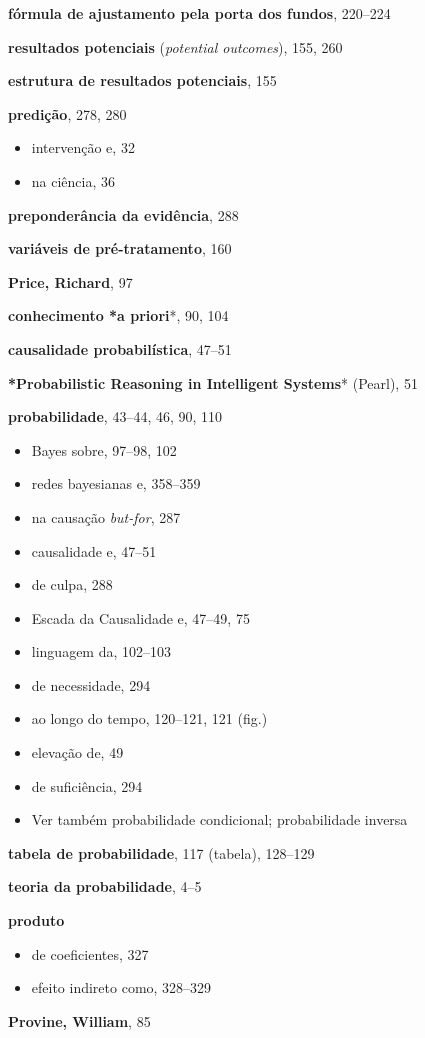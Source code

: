 \documentclass[11pt,a5paper,twoside]{book}
\begin{document}
\textbf{fórmula de ajustamento pela porta dos fundos}, 220–224

\textbf{resultados potenciais} (\textit{potential outcomes}), 155, 260

\textbf{estrutura de resultados potenciais}, 155

\textbf{predição}, 278, 280

\begin{itemize}
\item intervenção e, 32
\item na ciência, 36
\end{itemize}
\textbf{preponderância da evidência}, 288

\textbf{variáveis de pré-tratamento}, 160

\textbf{Price, Richard}, 97

\textbf{conhecimento *a priori}*, 90, 104

\textbf{causalidade probabilística}, 47–51

\textbf{*Probabilistic Reasoning in Intelligent Systems}* (Pearl), 51

\textbf{probabilidade}, 43–44, 46, 90, 110

\begin{itemize}
\item Bayes sobre, 97–98, 102
\item redes bayesianas e, 358–359
\item na causação \textit{but-for}, 287
\item causalidade e, 47–51
\item de culpa, 288
\item Escada da Causalidade e, 47–49, 75
\item linguagem da, 102–103
\item de necessidade, 294
\item ao longo do tempo, 120–121, 121 (fig.)
\item elevação de, 49
\item de suficiência, 294
\item Ver também probabilidade condicional; probabilidade inversa
\end{itemize}
\textbf{tabela de probabilidade}, 117 (tabela), 128–129

\textbf{teoria da probabilidade}, 4–5

\textbf{produto}

\begin{itemize}
\item de coeficientes, 327
\item efeito indireto como, 328–329
\end{itemize}
\textbf{Provine, William}, 85
\end{document}
